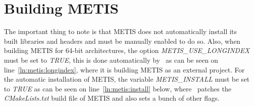 \documentclass[10pt,a4paper]{article}
\begin{document}
\section{Building METIS}
The important thing to note is that METIS does not automatically install its
built libraries and headers and must be manually enabled to do so. Also, when
building METIS for 64-bit architectures, the option
\textit{METIS\_USE\_LONGINDEX} must be set to \textit{TRUE}, this is done
automatically by \chastelibbuilder\ as can be seen on
line~\ref{ln:metis:longindex}, where it is building METIS as an external
project. For the automatic installation of METIS, the variable
\textit{METIS\_INSTALL} must be set to \textit{TRUE} as can be seen on
line~\ref{ln:metis:install} below, where \chastelibbuilder\ patches the
\textit{CMakeLists.txt} build file of METIS and also sets a bunch of other
flags.
\end{document}
